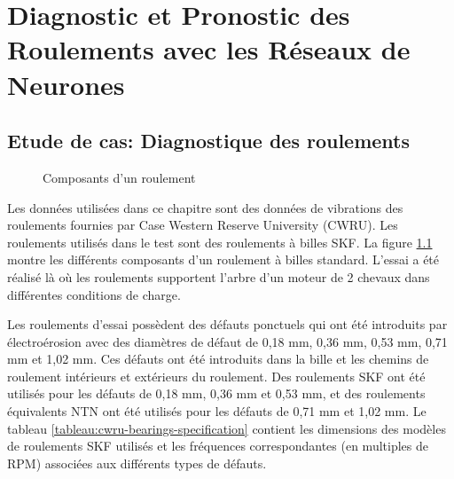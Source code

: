 \chapter{Diagnostic et Pronostic des Roulements avec les Réseaux de Neurones}
\label{chapter:diagnostic-and-prognostic-of-bearings-using-neural-networks}

\section{Etude de cas: Diagnostique des roulements}%
\label{sec:etude_de_cas_diagnostique_des_roulements}

\begin{figure}
    \centering
	
	\caption{Composants d'un roulement}
    \label{figure:skf-bearing-components}    
\end{figure}

Les données utilisées dans ce chapitre sont des données de vibrations des roulements fournies par Case Western Reserve University (CWRU). Les roulements utilisés dans le test sont des roulements à billes SKF. La figure \ref{figure:skf-bearing-components} montre les différents composants d'un roulement à billes standard. L'essai a été réalisé là où les roulements supportent l'arbre d'un moteur de 2 chevaux dans différentes conditions de charge. 

Les roulements d'essai possèdent des défauts ponctuels qui ont été introduits par électroérosion avec des diamètres de défaut de 0,18 mm, 0,36 mm, 0,53 mm, 0,71 mm et 1,02 mm. Ces défauts ont été introduits dans la bille et les chemins de roulement intérieurs et extérieurs du roulement. Des roulements SKF ont été utilisés pour les défauts de 0,18 mm, 0,36 mm et 0,53 mm, et des roulements équivalents NTN ont été utilisés pour les défauts de 0,71 mm et 1,02 mm. Le tableau \ref{tableau:cwru-bearings-specification} contient les dimensions des modèles de roulements SKF utilisés et les fréquences correspondantes (en multiples de RPM) associées aux différents types de défauts.

